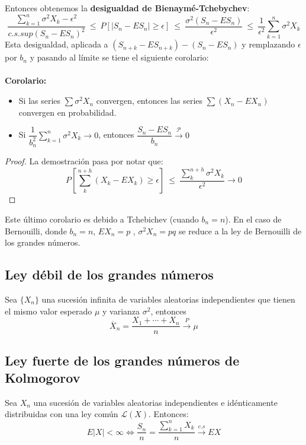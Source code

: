 Entonces obtenemos la \textbf{desigualdad de Bienaymé-Tchebychev}:
$$\frac{\displaystyle\sum_{k=1}^n \sigma^2 X_k-\epsilon ^2}{c.s.sup(S_n-ES_n)^2} 
\ \leq \ 
P[|S_n-ES_n|\geq \epsilon]
\ \leq \ 
\frac{\sigma^2(S_n-ES_n)}{\epsilon^2} 
\ \leq \ 
\frac{1}{\epsilon^2}\sum_{k=1}^n\sigma^2 X_k$$
Esta desigualdad, aplicada a $(S_{n+k}-ES_{n+k})-(S_n-ES_n)$ y remplazando $\epsilon$ por $b_n$ y pasando al límite se tiene el siguiente corolario:
\\\\
\textbf{Corolario: }
\begin{itemize}
\item Si las series $\sum\sigma^2 X_n$ convergen, entonces las series $\sum (X_n-EX_n)$ convergen en probabilidad.
\item Si $\dfrac{1}{b_n^2}\displaystyle\sum_{k=1}^n \sigma^2 X_k\rightarrow 0$, entonces $\dfrac{S_n - ES_n}{b_n}\stackrel{\mathcal{P}}{\rightarrow}0$\\
\end{itemize}
\begin{proof}
La demostración pasa por notar que:
$$P \left[\sum_{k}^{n+h}(X_k - EX_k)\geq\epsilon\right]
\ \leq \ \dfrac{\displaystyle\sum_{k}^{n+h}\sigma^2 X_k}{\epsilon^2}\longrightarrow 0$$
\end{proof}
Este último corolario es debido a Tchebichev (cuando $b_n=n$). En el caso de Bernouilli, donde $b_n=n$, $EX_n=p$ , $\sigma^2 X_n=pq$ se reduce a la ley de Bernouilli de los grandes números.


\subsection{Ley débil de los grandes números}
Sea $\{X_n\}$ una sucesión infinita de variables aleatorias independientes que tienen el mismo valor esperado $\mu$ y varianza $\sigma^2$, entonces 
$$
 \overline{X}_n = \frac{X_1+\cdots+X_n}{n} 
 \stackrel{P}{\longrightarrow} \mu
$$

\subsection{Ley fuerte de los grandes números de Kolmogorov}
Sea ${X_n}$ una sucesión de variables aleatorias independientes e idénticamente distribuidas con una ley común $\mathcal{L}(X)$. Entonces:
$$E|X| < \infty
\Longleftrightarrow 
\dfrac{S_n}{n}=\dfrac{\sum_{k=1}^n X_k}{n}\stackrel{c.s}{\longrightarrow}EX$$

